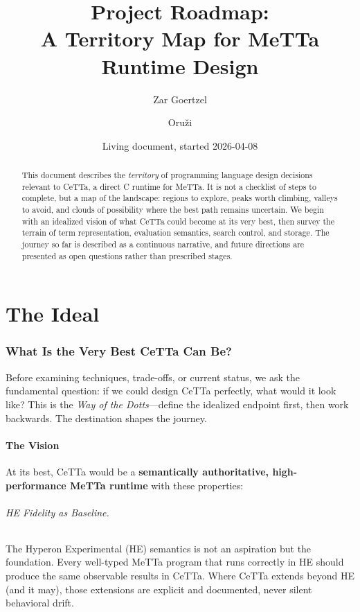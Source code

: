 \documentclass[11pt]{article}
\title{\CeTTa{} Project Roadmap:\\
  \large A Territory Map for MeTTa Runtime Design}
\author{Zar Goertzel \and Oru\v{z}i}
\date{Living document, started 2026-04-08}
\newcommand{\HE}{\textup{HE}}
\newcommand{\CeTTa}{\textup{CeTTa}}
\begin{document}
\maketitle

\begin{abstract}
This document describes the \emph{territory} of programming language
design decisions relevant to \CeTTa{}, a direct C runtime for MeTTa.
It is not a checklist of steps to complete, but a map of the landscape:
regions to explore, peaks worth climbing, valleys to avoid, and clouds
of possibility where the best path remains uncertain.  We begin with
an idealized vision of what \CeTTa{} could become at its very best,
then survey the terrain of term representation, evaluation semantics,
search control, and storage.  The journey so far is described as a
continuous narrative, and future directions are presented as open
questions rather than prescribed stages.
\end{abstract}

\tableofcontents

\part{The Ideal}

\section{What Is the Very Best CeTTa Can Be?}
\label{sec:ideal}

Before examining techniques, trade-offs, or current status, we ask the
fundamental question: if we could design \CeTTa{} perfectly, what would
it look like?  This is the \emph{Way of the Dotts}---define the idealized
endpoint first, then work backwards.  The destination shapes the journey.

\subsection{The Vision}

At its best, \CeTTa{} would be a \textbf{semantically authoritative,
high-performance MeTTa runtime} with these properties:

\paragraph{HE Fidelity as Baseline.}
The Hyperon Experimental (\HE{}) semantics is not an aspiration but the
foundation.  Every well-typed MeTTa program that runs correctly in \HE{}
should produce the same observable results in \CeTTa{}.  Where \CeTTa{}
extends beyond \HE{} (and it may), those extensions are explicit and
documented, never silent behavioral drift.
\end{document}
